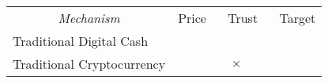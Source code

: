 
\begin{table}[t!]
\centering

	\begin{tabular}{llllllllll}

&
\headrow{Corrects undervaluation} &
\headrow{Corrects overvaluation} &
\headrow{Decentralizes issuance } &
\headrow{Decentralizes redemption} &
\headrow{Decentralizes transfer} &
\headrow{No trusted oracle} &
\headrow{Any asset} &
\headrow{Any price level} &
\headrow{Any event} \\
\hline

	 \multicolumn{1}{c|}{\textit{Mechanism} } &    \multicolumn{2}{c|}{Price} &  \multicolumn{4}{c|}{Trust} &  \multicolumn{3}{c|}{Target} \\

	\hline

	Traditional Digital Cash	& \multicolumn{1}{|c|}{\full} & \multicolumn{1}{c|}{\full}   & \multicolumn{1}{c|}{} & \multicolumn{1}{c|}{} & \multicolumn{1}{c|}{} & \multicolumn{1}{c|}{\full} & \multicolumn{1}{c|}{\full} & \multicolumn{1}{c|}{} & \multicolumn{1}{c|}{}   \\
	
	Traditional Cryptocurrency & \multicolumn{1}{|c|}{} & \multicolumn{1}{c|}{}   & \multicolumn{1}{c|}{\full} & \multicolumn{1}{c|}{$\times$} & \multicolumn{1}{c|}{\full} & \multicolumn{1}{c|}{\full} & \multicolumn{1}{c|}{} & \multicolumn{1}{c|}{} & \multicolumn{1}{c|}{} \\

	\hline


\end{tabular}
\end{table}
